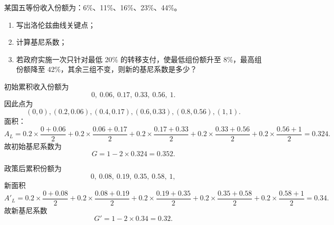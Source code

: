 \begin{question}
某国五等份收入份额为：6\%、11\%、16\%、23\%、44\%。
\begin{enumerate}[label=(\alph*),leftmargin=2.5em]
  \item 写出洛伦兹曲线关键点；
  \item 计算基尼系数；
  \item 若政府实施一次只针对最低 20\% 的转移支付，使最低组份额升至 8\%，最高组份额降至 42\%，其余三组不变，则新的基尼系数是多少？
\end{enumerate}
\begin{solution}
初始累积收入份额为
\[
0,\ 0.06,\ 0.17,\ 0.33,\ 0.56,\ 1.
\]
因此点为
\[
(0,0),(0.2,0.06),(0.4,0.17),(0.6,0.33),(0.8,0.56),(1,1).
\]
面积：
\[
A_L=0.2\times\frac{0+0.06}{2}+0.2\times\frac{0.06+0.17}{2}+0.2\times\frac{0.17+0.33}{2}+0.2\times\frac{0.33+0.56}{2}+0.2\times\frac{0.56+1}{2}=0.324.
\]
故初始基尼系数为
\[
G=1-2\times0.324=0.352.
\]

政策后累积份额为
\[
0,\ 0.08,\ 0.19,\ 0.35,\ 0.58,\ 1,
\]
新面积
\[
A'_L=0.2\times\frac{0+0.08}{2}+0.2\times\frac{0.08+0.19}{2}+0.2\times\frac{0.19+0.35}{2}+0.2\times\frac{0.35+0.58}{2}+0.2\times\frac{0.58+1}{2}=0.34.
\]
故新基尼系数
\[
G'=1-2\times0.34=0.32.
\]
\end{solution}
\end{question}

